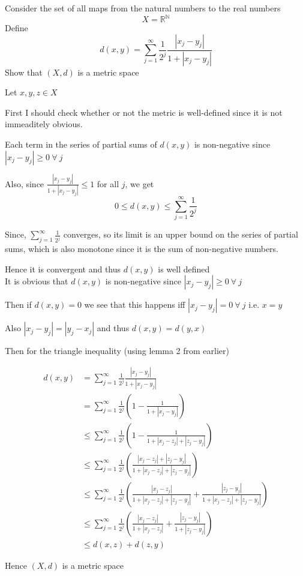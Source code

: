 \documentclass{article}
\begin{document}
\begin{problem}
Consider the set of all maps from the natural numbers to the real numbers
\[
	X = \mathbb{R}^{\mathbb{N}}
\]
Define
\[
	d(x,y) = \sum_{j=1}^{\infty} \frac{1}{2^j}\frac{|x_j-y_j|}{1+|x_j-y_j|}
\]
Show that \( (X,d) \) is a metric space

\begin{solution}
	Let \( x,y,z \in X \)

	First I should check whether or not the metric is well-defined since it is not immeaditely obvious.

	Each term in the series of partial sums of \( d(x,y) \) is non-negative since \( |x_j-y_j| \ge 0 \ \forall \ j \)

	Also, since \( \frac{|x_j-y_j|}{1 + |x_j - y_j|} \le 1 \) for all \( j \), we get
	\[
		0 \le d(x,y) \le \sum_{j=1}^{\infty} \frac{1}{2^j}
	\]

	Since, \( \sum_{j=1}^{\infty} \frac{1}{2^j} \) converges, so its limit is an upper bound on the series of partial sums, which is also monotone since it is the sum of non-negative numbers.

	Hence it is convergent and thus \( d(x,y) \) is well defined
	\\

	It is obvious that \( d(x,y) \) is non-negative since \( |x_j-y_j| \ge 0 \ \forall \ j \)

	Then if \( d(x,y)  = 0 \) we see that this happens iff \( |x_j - y_j|  = 0 \ \forall \ j\) i.e. \( x = y \)

	Also  \( |x_j - y_j| = |y_j - x_j| \) and thus \( d(x,y) = d(y,x) \)

	Then for the triangle inequality (using lemma 2 from earlier)

	\begin{align*}
		d(x,y) & = \sum_{j=1}^{\infty} \frac{1}{2^j} \frac{|x_j-y_j|}{1 + |x_j-y_j|}                                                                                \\
		       & = \sum_{j=1}^{\infty} \frac{1}{2^j}\left( 1 - \frac{1}{1 + |x_j-y_j|} \right)                                                                      \\
		       & \le \sum_{j=1}^{\infty} \frac{1}{2^j}\left( 1 - \frac{1}{1 + |x_j-z_j| + |z_j- y_j|} \right)                                                       \\
		       & \le \sum_{j=1}^{\infty} \frac{1}{2^j}\left( \frac{|x_j - z_j| + |z_j - y_j|}{1 + |x_j-z_j| + |z_j-y_j|} \right)                                    \\
		       & \le \sum_{j=1}^{\infty} \frac{1}{2^j}\left( \frac{|x_j-z_j|}{1 + |x_j-z_j| + |z_j-y_j|} + \frac{|z_j-y_j|}{1 + |x_j - z_j| + | z_j - y_j|} \right) \\
		       & \le \sum_{j=1}^{\infty} \frac{1}{2^j}\left( \frac{|x_j-z_j|}{1 + |x_j-z_j|} + \frac{|z_j-y_j|}{1 + | z_j - y_j|} \right)                           \\
		       & \le d(x,z) + d(z,y)
	\end{align*}

	Hence \( (X,d) \) is a metric space
\end{solution}
\end{problem}
\end{document}
